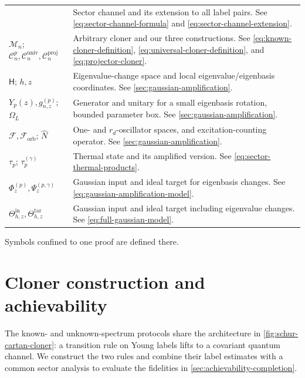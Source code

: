\documentclass[11pt]{article}
\theoremstyle{remark}
\theoremstyle{plain}
\newcommand{\cC}{\mathcal C}
\newcommand{\cF}{\mathcal F}
\newcommand{\cM}{\mathcal M}
\begin{document}
\begin{longtable}{@{}>{\raggedright\arraybackslash}p{.28\linewidth}>{\raggedright\arraybackslash}p{}@{}}
& Sector channel and its extension to all label pairs. See
  \eqref{eq:sector-channel-formula} and
  \eqref{eq:sector-channel-extension}. \\[3pt]
\(\cM_n\); \(\cC_n^p,\cC_n^{\mathrm{univ}},\cC_n^{\mathrm{proj}}\)
& Arbitrary cloner and our three constructions. See
  \eqref{eq:known-cloner-definition}, \eqref{eq:universal-cloner-definition},
  and \eqref{eq:projector-cloner}. \\[3pt]
\(\mathsf H\); \(h,z\)
& Eigenvalue-change space and local eigenvalue/eigenbasis coordinates. See
  \cref{sec:gaussian-amplification}. \\[3pt]
\(Y_p(z),g_{n,z}^{(p)}\); \(\Omega_L\)
& Generator and unitary for a small eigenbasis rotation, bounded parameter
  box.  See
  \cref{sec:gaussian-amplification}. \\[3pt]
\(\cF,\cF_{\mathrm{orb}}\); \(\widehat N\)
& One- and \(r_d\)-oscillator spaces, and excitation-counting operator. See
  \cref{sec:gaussian-amplification}. \\[3pt]
\(\tau_p\); \(\tau_p^{(\gamma)}\)
& Thermal state and its amplified version. See
  \eqref{eq:sector-thermal-products}. \\[3pt]
\(\Phi_z^{(p)},\Psi_z^{(p,\gamma)}\)
& Gaussian input and ideal target for eigenbasis changes. See
  \eqref{eq:gaussian-amplification-model}. \\[3pt]
\(\Theta_{h,z}^{\mathrm{in}},\Theta_{h,z}^{\mathrm{tar}}\)
& Gaussian input and ideal target including eigenvalue changes. See
  \eqref{eq:full-gaussian-model}.
\end{longtable}
\endgroup
Symbols confined to one proof are defined there.


\section{Cloner construction and achievability}\label{sec:achievability}

The known- and unknown-spectrum protocols share the architecture in
\cref{fig:schur-cartan-cloner}: a transition rule on Young labels lifts to a
covariant quantum channel.  We construct the two rules and combine their
label estimates with a common sector analysis to evaluate the fidelities
in \cref{sec:achievability-completion}.
\end{document}
